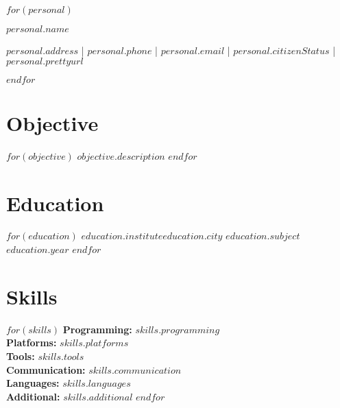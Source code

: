 \documentclass[$documentclass.fontsize$, $documentclass.papersize$]{$documentclass.class$}
\begin{document}
$for(personal)$
    \noindent
    \begin{centering} \Huge{$personal.name$} \\
    \end{centering}

    \vspace{.1cm}

    \begin{centering}
      \small
        {$personal.address$} |
        {$personal.phone$}   |
        {$personal.email$}   |
        {$personal.citizenStatus$} |
        {\href{$personal.website$}{$personal.prettyurl$}} \\
    \end{centering}
$endfor$

\vspace{-.5cm} %

\section*{Objective}
$for(objective)$
  {$objective.description$}
$endfor$

\vspace{-.5cm} %

\section*{Education}
  \resumeSubHeadingListStart
    $for(education)$
      \resumeSubheading
        {$education.institute$}{$education.city$}
        {$education.subject$}{$education.year$}
    $endfor$
  \resumeSubHeadingListEnd

\vspace{-.5cm} %

\section*{Skills}
  $for(skills)$ %
      \textbf{Programming:} {$skills.programming$} \\
      \textbf{Platforms:} {$skills.platforms$} \\
      \textbf{Tools:} {$skills.tools$} \\
      \textbf{Communication:} {$skills.communication$} \\
      \textbf{Languages:} {$skills.languages$} \\
      \textbf{Additional:} {$skills.additional$}
  $endfor$
\end{document}
